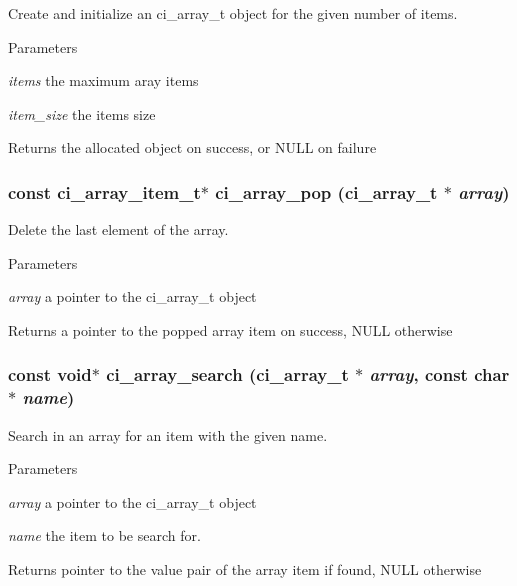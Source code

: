 Create and initialize an ci\_\-array\_\-t object for the given number of items. 
\begin{DoxyParams}{Parameters}
\item[{\em items}]the maximum aray items \item[{\em item\_\-size}]the items size \end{DoxyParams}
\begin{DoxyReturn}{Returns}
the allocated object on success, or NULL on failure 
\end{DoxyReturn}
\hypertarget{group__SIMPLE__ARRAYS_ga87cf1f8199d58d2138f22697f611d76f}{
\subsubsection[{ci\_\-array\_\-pop}]{\setlength{\rightskip}{0pt plus 5cm}const ci\_\-array\_\-item\_\-t$\ast$ ci\_\-array\_\-pop ({\bf ci\_\-array\_\-t} $\ast$ {\em array})}}
\label{group__SIMPLE__ARRAYS_ga87cf1f8199d58d2138f22697f611d76f}


Delete the last element of the array. 
\begin{DoxyParams}{Parameters}
\item[{\em array}]a pointer to the ci\_\-array\_\-t object \end{DoxyParams}
\begin{DoxyReturn}{Returns}
a pointer to the popped array item on success, NULL otherwise 
\end{DoxyReturn}
\hypertarget{group__SIMPLE__ARRAYS_gaa6879d90b23e4a1cd17cdebd389b2b6e}{
\subsubsection[{ci\_\-array\_\-search}]{\setlength{\rightskip}{0pt plus 5cm}const void$\ast$ ci\_\-array\_\-search ({\bf ci\_\-array\_\-t} $\ast$ {\em array}, \/  const char $\ast$ {\em name})}}
\label{group__SIMPLE__ARRAYS_gaa6879d90b23e4a1cd17cdebd389b2b6e}


Search in an array for an item with the given name. 
\begin{DoxyParams}{Parameters}
\item[{\em array}]a pointer to the ci\_\-array\_\-t object \item[{\em name}]the item to be search for. \end{DoxyParams}
\begin{DoxyReturn}{Returns}
pointer to the value pair of the array item if found, NULL otherwise 
\end{DoxyReturn}

